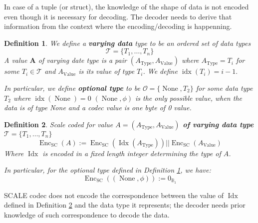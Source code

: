 \documentclass{book}
\newcommand{\assign}{:=}
\newcommand{\tmmathbf}[1]{\ensuremath{\boldsymbol{#1}}}
\newcommand{\tmop}[1]{\ensuremath{\operatorname{#1}}}
\newcommand{\tmstrong}[1]{\textbf{#1}}
\newcommand{\tmtextbf}[1]{{\bfseries{#1}}}
\newtheorem{definition}{Definition}
\providecommand{\tmop}[1]{\ensuremath{\mathrm{#1}}}
\providecommand{\tmstrong}[1]{\tmtextbf{#1}}
\providecommand{\tmtextbf}[1]{\tmtextbf{#1}}
\newtheorem{definition}{Definition}
\begin{document}
In case of a tuple (or struct), the knowledge of the shape of data is not
encoded even though it is necessary for decoding. The decoder needs to derive
that information from the context where the encoding/decoding is happenning.

\begin{definition}
  \label{defn-varrying-data-type}We define a {\tmstrong{varying data}} type to
  be an ordered set of data types
  \[ \mathcal{T}= \{ T_1, \ldots, T_n \} \]
  A value $\tmmathbf{A}$ of varying date type is a pair $(A_{\tmop{Type}},
  A_{\tmop{Value}})$ where $A_{\tmop{Type}} = T_i$ for some $T_i \in
  \mathcal{T}$ and $A_{\tmop{Value}}$ is its value of type $T_i$. We define
  $\tmop{idx} (T_i) = i - 1.$
  
  In particular, we define {\tmstrong{optional type}} to be $\mathcal{O}= \{
  \tmop{None}, T_2 \}$ for some data type $T_2$ where $\tmop{idx}
  (\tmop{None}) = 0$ $(\tmop{None}, \phi)$ is the only possible value, when
  the data is of type None and a codec value is one byte of 0 value.
  
  
\end{definition}

\begin{definition}
  \label{defn-scale-variable-type}Scale coded for value {\tmstrong{$A =
  (A_{\tmop{Type}}, A_{\tmop{Value}})$ of varying data type}} $\mathcal{T}= \{
  T_1, \ldots, T_n \}$
  \[ \tmop{Enc}_{\tmop{SC}} (A) \assign \tmop{Enc}_{\tmop{SC}} (\tmop{Idx}
     (A_{\tmop{Type}})) | | \tmop{Enc}_{\tmop{SC}} (A_{\tmop{Value}}) \]
  Where $\tmop{Idx}$ is encoded in a fixed length integer determining the type
  of $A$.
  
  In particular, for the optional type defined in Definition
  \ref{defn-varrying-data-type}, we have:
  \[ \tmop{Enc}_{\tmop{SC}} ((\tmop{None}, \phi)) \assign 0_{\mathbb{B}_1} \]
\end{definition}

SCALE codec does not encode the correspondence between the value of
$\tmop{Idx}$ defined in Definition \ref{defn-scale-variable-type} and the data
type it represents; the decoder needs prior knowledge of such correspondence
to decode the data.
\end{document}
